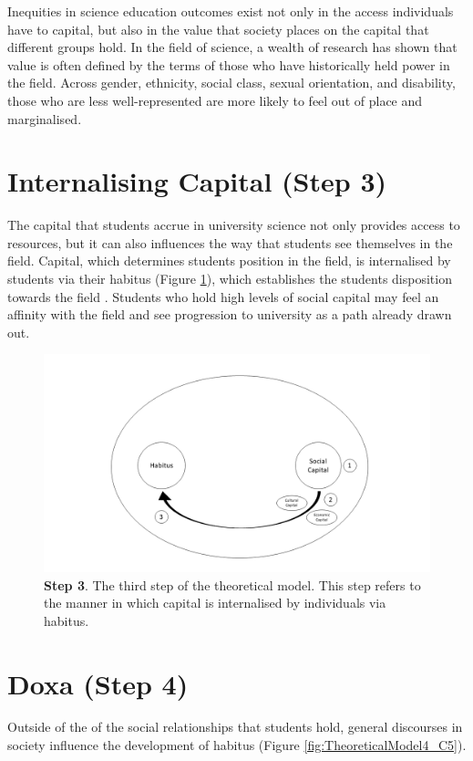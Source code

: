 Inequities in science education outcomes exist not only in the access individuals have to capital, but also in the value that society places on the capital that different groups hold. In the field of science, a wealth of research has shown that value is often defined by the terms of those who have historically held power in the field. Across gender, ethnicity, social class, sexual orientation, and disability, those who are less well-represented are more likely to feel out of place and marginalised. 


\section{Internalising Capital (Step 3)}
The capital that students accrue in university science not only provides access to resources, but it can also influences the way that students see themselves in the field. Capital, which determines students position in the field, is internalised by students via their habitus  (Figure \ref{fig:TheoreticalModel3_C5}), which establishes the students disposition towards the field \cite{Bourdieu1992}. Students who hold high levels of social capital may feel an affinity with the field and see progression to university as a path already drawn out.

\begin{figure}[ht]
\centering
\includegraphics[width=\textwidth]{C5 - Understanding Capital Accumulation/HabitusSocCap_TheoreticalModel3.png}
\caption{\label{fig:TheoreticalModel3_C5}\textbf{Step 3}. The third step of the theoretical model. This step refers to the manner in which capital is internalised by individuals via habitus.}
\end{figure}



\section{Doxa (Step 4)}
Outside of the of the social relationships that students hold, general discourses in society influence the development of habitus (Figure \ref{fig:TheoreticalModel4_C5}). 

